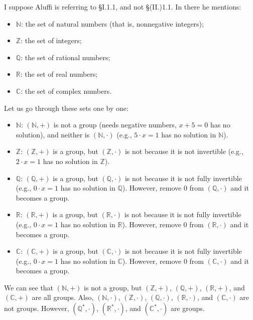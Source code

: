 \documentclass[12pt, letterpaper, twoside]{report}
\begin{document}
I suppose Aluffi is referring to §I.1.1, and not §(II.)1.1. In there he mentions:

\begin{itemize}
	\item $\mathbb{N}$: the set of natural numbers (that is, nonnegative integers);
	\item $\mathbb{Z}$: the set of integers;
	\item $\mathbb{Q}$: the set of rational numbers;
	\item $\mathbb{R}$: the set of real numbers;
	\item $\mathbb{C}$: the set of complex numbers.
\end{itemize}

Let us go through these sets one by one:

\begin{itemize}
	\item $\mathbb{N}$: $(\mathbb{N}, +)$ is not a group (needs negative numbers, $x + 5 = 0$ has no solution), and neither is $(\mathbb{N}, \cdot)$ (e.g., $5 \cdot x = 1$ has no solution in $\mathbb{N}$).
	\item $\mathbb{Z}$: $(\mathbb{Z}, +)$ is a group, but $(\mathbb{Z}, \cdot)$ is not because it is not invertible (e.g., $2 \cdot x = 1$ has no solution in $\mathbb{Z}$).
	\item $\mathbb{Q}$: $(\mathbb{Q}, +)$ is a group, but $(\mathbb{Q}, \cdot)$ is not because it is not fully invertible (e.g., $0 \cdot x = 1$ has no solution in $\mathbb{Q}$). However, remove $0$ from $(\mathbb{Q}, \cdot)$ and it becomes a group.
	\item $\mathbb{R}$: $(\mathbb{R}, +)$ is a group, but $(\mathbb{R}, \cdot)$ is not because it is not fully invertible (e.g., $0 \cdot x = 1$ has no solution in $\mathbb{R}$). However, remove $0$ from $(\mathbb{R}, \cdot)$ and it becomes a group.
	\item $\mathbb{C}$: $(\mathbb{C}, +)$ is a group, but $(\mathbb{C}, \cdot)$ is not because it is not fully invertible (e.g., $0 \cdot x = 1$ has no solution in $\mathbb{C}$). However, remove $0$ from $(\mathbb{C}, \cdot)$ and it becomes a group.
\end{itemize}

We can see that $(\mathbb{N}, +)$ is not a group, but $(\mathbb{Z}, +)$, $(\mathbb{Q}, +)$, $(\mathbb{R}, +)$, and $(\mathbb{C}, +)$ are all groups. Also, $(\mathbb{N}, \cdot)$, $(\mathbb{Z}, \cdot)$, $(\mathbb{Q}, \cdot)$, $(\mathbb{R}, \cdot)$, and $(\mathbb{C}, \cdot)$ are not groups. However, $(\mathbb{Q}^*, \cdot)$, $(\mathbb{R}^*, \cdot)$, and $(\mathbb{C}^*, \cdot)$ are groups.
\end{document}

